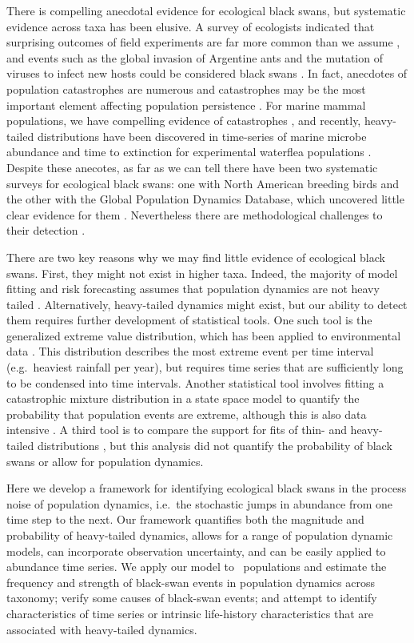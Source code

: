 There is compelling anecdotal evidence for ecological black swans, but
systematic evidence across taxa has been elusive. A survey of ecologists
indicated that surprising outcomes of field experiments are far more common
than we assume \citep{doak2008}, and events such as the global invasion of
Argentine ants and the mutation of viruses to infect new hosts could be
considered black swans \citep{nunez2012}. In fact, anecdotes of population
catastrophes are numerous and catastrophes may be the most important element
affecting population persistence \citep{mangel1994}. For marine mammal
populations, we have compelling evidence of catastrophes \citep{gerber2001,
  ward2007}, and recently, heavy-tailed distributions have been discovered in
time-series of marine microbe abundance \citep{segura2013} and time to
extinction for experimental waterflea populations \citep{drake2014}. Despite
these anecotes, as far as we can tell there have been two systematic surveys
for ecological black swans: one with North American breeding birds and the
other with the Global Population Dynamics Database, which uncovered little
clear evidence for them \citep{keitt1998,allen2001,halley2002}. Nevertheless
there are methodological challenges to their detection
\citep{allen2001,ward2007}.

There are two key reasons why we may find little evidence of ecological black
swans. First, they might not exist in higher taxa. Indeed, the majority of
model fitting and risk forecasting assumes that population dynamics are not
heavy tailed \citep[e.g.][]{brook2006a,dennis2006,knape2012}. Alternatively,
heavy-tailed dynamics might exist, but our ability to detect them requires
further development of statistical tools. One such tool is the generalized
extreme value distribution, which has been applied to environmental data
\citep[e.g.][]{katz2005}. This distribution describes the most extreme event
per time interval (e.g.~heaviest rainfall per year), but requires time series
that are sufficiently long to be condensed into time intervals. Another
statistical tool involves fitting a catastrophic mixture distribution in a
state space model to quantify the probability that population events are
extreme, although this is also data intensive \citep{ward2007}. A third tool is
to compare the support for fits of thin- and heavy-tailed distributions
\citep{halley2002}, but this analysis did not quantify the probability of black
swans or allow for population dynamics.

Here we develop a framework for identifying ecological black swans in the
process noise of population dynamics, i.e.\ the stochastic jumps in abundance
from one time step to the next. Our framework quantifies both the magnitude and
probability of heavy-tailed dynamics, allows for a range of population dynamic
models, can incorporate observation uncertainty, and can be easily applied to
abundance time series. We apply our model to \NPops\ populations and estimate
the frequency and strength of black-swan events in population dynamics across
taxonomy; verify some causes of black-swan events; and attempt to identify
characteristics of time series or intrinsic life-history characteristics that
are associated with heavy-tailed dynamics.

